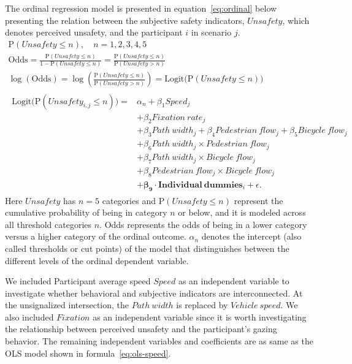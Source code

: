 \documentclass[3p,authoryear]{elsarticle}
\begin{document}
The ordinal regression model is presented in equation~\eqref{eq:ordinal} below
presenting the relation between the subjective safety indicators, $Unsafety$,
which denotes perceived unsafety, and the participant $i$ in scenario $j$.
%
\begin{equation}\label{eq:ordinal}
  \begin{gathered}
    \mathrm{P}(Unsafety \leq n),\quad n = 1,2,3,4,5\\[4pt]
    \mathrm{Odds} = \frac{\mathrm{P}(Unsafety \leq n)}
                         {1-\mathrm{P}(Unsafety \leq n)}
                  = \frac{\mathrm{P}(Unsafety \leq n)}
                         {\mathrm{P}(Unsafety > n)}\\[4pt]
    \log(\mathrm{Odds}) = \log\!\left(
        \frac{\mathrm{P}(Unsafety \leq n)}{\mathrm{P}(Unsafety > n)}\right)
      = \mathrm{Logit}\bigl(\mathrm{P}(Unsafety \leq n)\bigr)\\[6pt]
    \begin{aligned}
      \mathrm{Logit}\bigl(\mathrm{P}(Unsafety_{i,j} \leq n)\bigr) ={}&
          \alpha_n + \beta_1 Speed_j\\
        & + \beta_2 Fixation\ rate_j\\
        & + \beta_3 Path\ width_j + \beta_4 Pedestrian\ flow_j
          + \beta_5 Bicycle\ flow_j\\
        & + \beta_6 Path\ width_j \times Pedestrian\ flow_j\\
        & + \beta_7 Path\ width_j \times Bicycle\ flow_j\\
        & + \beta_8 Pedestrian\ flow_j \times Bicycle\ flow_j\\
        & + \bm{\beta_9} \cdot
            \bm{Individual\ dummies}_i + \epsilon .
    \end{aligned}
  \end{gathered}
\end{equation}
%
Here $Unsafety$ has $n=5$ categories and $\mathrm{P}(Unsafety \leq n)$ represent
the cumulative probability of being in category $n$ or below, and it is modeled
across all threshold categories $n$. Odds represents the odds of being in a
lower category versus a higher category of the ordinal outcome. $\alpha_n$
denotes the intercept (also called thresholds or cut points) of the model that
distinguishes between the different levels of the ordinal dependent variable.

We included Participant average speed $Speed$ as an independent variable to
investigate whether behavioral and subjective indicators are interconnected. At
the unsignalized intersection, the $Path\ width$ is replaced by $Vehicle\ speed$.
We also included $Fixation$ as an independent variable since it is worth
investigating the relationship between perceived unsafety and the participant's
gazing behavior. The remaining independent variables and coefficients are as
same as the OLS model shown in formula~\eqref{eq:ols-speed}.
\end{document}
